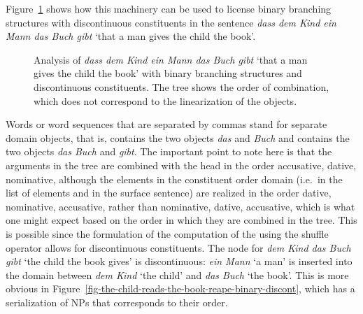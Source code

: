 \documentclass[output=paper
	        ,collection
	        ,collectionchapter
 	        ,biblatex
                ,babelshorthands
                ,newtxmath
                ,draftmode
                ,colorlinks, citecolor=brown
]{langscibook}
\begin{document}
Figure~\ref{fig-the-child-reads-the-book-reape-binary} shows how this machinery can be used to license binary
branching structures with discontinuous constituents in the sentence
\emph{dass dem Kind ein Mann das Buch gibt} `that a man gives the
child the book'.
\begin{figure}
\caption{\label{fig-the-child-reads-the-book-reape-binary}Analysis of \emph{dass dem Kind ein Mann das Buch
    gibt} `that a man gives the child the book' with binary branching structures and discontinuous
  constituents. The tree shows the order of combination, which does not correspond to the
  linearization of the \domain objects.}
\end{figure}%
Words or word sequences that are separated by commas stand for separate domain objects, that is,
 contains the two objects \emph{das} and \emph{Buch} and  contains the two objects \emph{das Buch} and \emph{gibt}.
The important point to note here is that the
arguments in the tree are combined with the head in the order
accusative, dative, nominative, although the elements in the
constituent order domain (i.e.\ in the list of \domain elements and in
the surface sentence) are realized in the order dative, nominative,
accusative, rather than nominative, dative, accusative, which is what
one might expect based on the order in which they are combined in the
tree. This is possible since the formulation of the computation of the \domv using the shuffle
operator allows for discontinuous constituents. The node for \emph{dem Kind das Buch gibt} `the
child the book gives' is discontinuous: \emph{ein Mann} `a man' is inserted into the domain between
\emph{dem Kind} `the child' and \emph{das Buch} `the book'.  This is more obvious in Figure~\ref{fig-the-child-reads-the-book-reape-binary-discont}, which has a serialization of NPs that
corresponds to their order.
\end{document}
